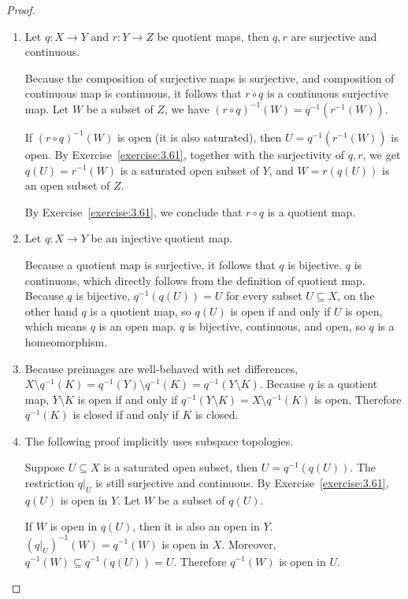 \begin{proof}
	\begin{enumerate}[label={(\alph*)}]
		\item Let $q: X\to Y$ and $r: Y\to Z$ be quotient maps, then $q, r$ are surjective and continuous.

		      Because the composition of surjective maps is surjective, and composition of continuous map is continuous, it follows that $r\circ q$ is a continuous surjective map. Let $W$ be a subset of $Z$, we have ${(r\circ q)}^{-1}(W) = q^{-1}(r^{-1}(W))$.

		      If ${(r\circ q)}^{-1}(W)$ is open (it is also saturated), then $U = q^{-1}(r^{-1}(W))$ is open. By Exercise~\ref{exercise:3.61}, together with the surjectivity of $q, r$, we get $q(U) = r^{-1}(W)$ is a saturated open subset of $Y$, and $W = r(q(U))$ is an open subset of $Z$.

		      By Exercise~\ref{exercise:3.61}, we conclude that $r\circ q$ is a quotient map.
		\item Let $q: X\to Y$ be an injective quotient map.

		      Because a quotient map is surjective, it follows that $q$ is bijective. $q$ is continuous, which directly follows from the definition of quotient map. Because $q$ is bijective, $q^{-1}(q(U)) = U$ for every subset $U\subseteq X$, on the other hand $q$ is a quotient map, so $q(U)$ is open if and only if $U$ is open, which means $q$ is an open map. $q$ is bijective, continuous, and open, so $q$ is a homeomorphism.
		\item Because preimages are well-behaved with set differences, $X\setminus q^{-1}(K) = q^{-1}(Y)\setminus q^{-1}(K) = q^{-1}(Y\setminus K)$. Because $q$ is a quotient map, $Y\setminus K$ is open if and only if $q^{-1}(Y\setminus K) = X\setminus q^{-1}(K)$ is open. Therefore $q^{-1}(K)$ is closed if and only if $K$ is closed.
		\item The following proof implicitly uses subspace topologies.

		      Suppose $U\subseteq X$ is a saturated open subset, then $U = q^{-1}(q(U))$. The restriction $q\vert_{U}$ is still surjective and continuous. By Exercise~\ref{exercise:3.61}, $q(U)$ is open in $Y$. Let $W$ be a subset of $q(U)$.

		      If $W$ is open in $q(U)$, then it is also an open in $Y$. ${(q\vert_{U})}^{-1}(W) = q^{-1}(W)$ is open in $X$. Moreover, $q^{-1}(W)\subseteq q^{-1}(q(U)) = U$. Therefore $q^{-1}(W)$ is open in $U$.


\end{enumerate}
\end{proof}
